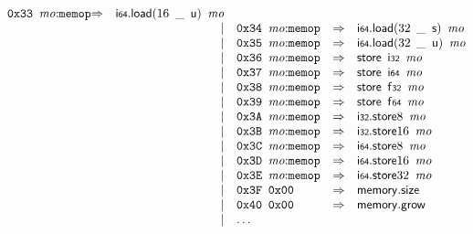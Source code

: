 $$\begin{array}{@{}l@{}rrlll@{}l@{}}
\mathtt{0x33}~\,{\mathit{mo}}{:}{\mathtt{memop}} &\Rightarrow& {\mathsf{i{\scriptstyle64}}.\mathsf{load}}{(16~\,\mathsf{\_}~\,\mathsf{u})}~\,{\mathit{mo}} \\ &&|&
\mathtt{0x34}~\,{\mathit{mo}}{:}{\mathtt{memop}} &\Rightarrow& {\mathsf{i{\scriptstyle64}}.\mathsf{load}}{(32~\,\mathsf{\_}~\,\mathsf{s})}~\,{\mathit{mo}} \\ &&|&
\mathtt{0x35}~\,{\mathit{mo}}{:}{\mathtt{memop}} &\Rightarrow& {\mathsf{i{\scriptstyle64}}.\mathsf{load}}{(32~\,\mathsf{\_}~\,\mathsf{u})}~\,{\mathit{mo}} \\ &&|&
\mathtt{0x36}~\,{\mathit{mo}}{:}{\mathtt{memop}} &\Rightarrow& \mathsf{store}~\,\mathsf{i{\scriptstyle32}}~\,{\mathit{mo}} \\ &&|&
\mathtt{0x37}~\,{\mathit{mo}}{:}{\mathtt{memop}} &\Rightarrow& \mathsf{store}~\,\mathsf{i{\scriptstyle64}}~\,{\mathit{mo}} \\ &&|&
\mathtt{0x38}~\,{\mathit{mo}}{:}{\mathtt{memop}} &\Rightarrow& \mathsf{store}~\,\mathsf{f{\scriptstyle32}}~\,{\mathit{mo}} \\ &&|&
\mathtt{0x39}~\,{\mathit{mo}}{:}{\mathtt{memop}} &\Rightarrow& \mathsf{store}~\,\mathsf{f{\scriptstyle64}}~\,{\mathit{mo}} \\ &&|&
\mathtt{0x3A}~\,{\mathit{mo}}{:}{\mathtt{memop}} &\Rightarrow& {\mathsf{i{\scriptstyle32}}.\mathsf{store}}{8}~\,{\mathit{mo}} \\ &&|&
\mathtt{0x3B}~\,{\mathit{mo}}{:}{\mathtt{memop}} &\Rightarrow& {\mathsf{i{\scriptstyle32}}.\mathsf{store}}{16}~\,{\mathit{mo}} \\ &&|&
\mathtt{0x3C}~\,{\mathit{mo}}{:}{\mathtt{memop}} &\Rightarrow& {\mathsf{i{\scriptstyle64}}.\mathsf{store}}{8}~\,{\mathit{mo}} \\ &&|&
\mathtt{0x3D}~\,{\mathit{mo}}{:}{\mathtt{memop}} &\Rightarrow& {\mathsf{i{\scriptstyle64}}.\mathsf{store}}{16}~\,{\mathit{mo}} \\ &&|&
\mathtt{0x3E}~\,{\mathit{mo}}{:}{\mathtt{memop}} &\Rightarrow& {\mathsf{i{\scriptstyle64}}.\mathsf{store}}{32}~\,{\mathit{mo}} \\ &&|&
\mathtt{0x3F}~\,\mathtt{0x00} &\Rightarrow& \mathsf{memory.size} \\ &&|&
\mathtt{0x40}~\,\mathtt{0x00} &\Rightarrow& \mathsf{memory.grow} \\ &&|&
\dots \\
\end{array}
$$

\vspace{1ex}

